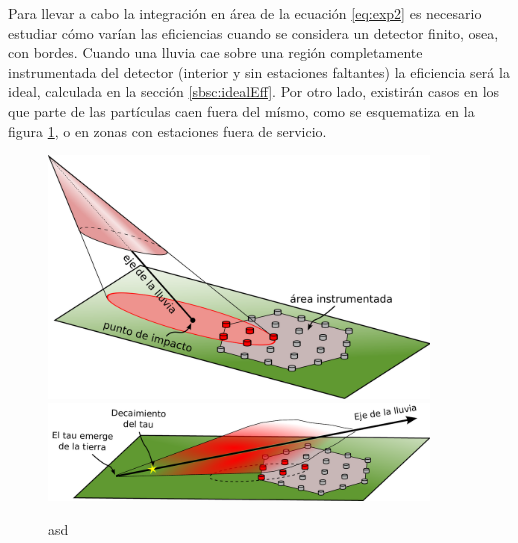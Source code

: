 	Para llevar a cabo la integración en área de la ecuación \ref{eq:exp2} es necesario estudiar cómo varían las eficiencias cuando se considera un detector finito, osea, con bordes.
	Cuando una lluvia cae sobre una región completamente instrumentada del detector (interior y sin estaciones faltantes) la eficiencia será la ideal, calculada en la sección \ref{sbsc:idealEff}.
	Por otro lado, existirán casos en los que parte de las partículas caen fuera del mísmo, como se esquematiza en la figura \ref{fig:lluviaFuera}, o en zonas con estaciones fuera de servicio.
	\begin{figure}[h!]
		\begin{center}
			\includegraphics[width=0.9\textwidth]{fig/resultadosAuger/lluviaFuera}\\
			\vspace*{0.1\textwidth}
			\includegraphics[width=0.9\textwidth]{fig/resultadosAuger/lluviaFuera_ES}
			\caption{asd}
			\label{fig:lluviaFuera}
		\end{center}
	\end{figure}
	
